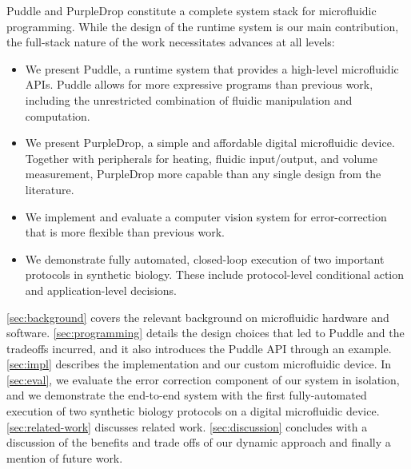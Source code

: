 \documentclass[sigconf, screen]{acmart}
\newcommand\mw[2][]{\todo[color=blue!20, #1]{\sf #2}}
\begin{document}
Puddle and PurpleDrop constitute a complete system stack for microfluidic programming.
While the design of the runtime system is our main contribution, the full-stack nature of the work necessitates advances at all levels:
\begin{itemize}
  \item We present Puddle, a runtime system that provides a high-level microfluidic APIs. Puddle allows for more expressive programs than previous work, including the unrestricted combination of fluidic manipulation and computation.
\item We present PurpleDrop, a simple and affordable digital microfluidic device. Together with peripherals for heating, fluidic input/output, and volume measurement, PurpleDrop more capable than any single design from the literature.
\item We implement and evaluate a computer vision system for error-correction that is more flexible than previous work.
\item We demonstrate fully automated, closed-loop execution of two important protocols in synthetic biology.
  These include protocol-level conditional action and application-level decisions.
\end{itemize}

\autoref{sec:background} covers the relevant background on microfluidic hardware and software.
\autoref{sec:programming} details the design choices that led to Puddle and the tradeoffs incurred, and it also introduces the Puddle API through an example.
\autoref{sec:impl} describes the implementation and our custom microfluidic device.
In \autoref{sec:eval}, we evaluate the error correction component of our system in isolation, and we demonstrate the end-to-end system with the first fully-automated execution of two synthetic biology protocols on a digital microfluidic device.
\autoref{sec:related-work} discusses related work.
\autoref{sec:discussion} concludes with a discussion of the benefits and trade offs of our dynamic approach and finally a mention of future work.
\end{document}
